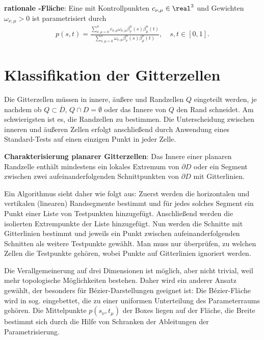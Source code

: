 \textbf{rationale -Fläche}:
Eine  mit Kontrollpunkten $c_{\nu,\mu} \in \real^3$ und
Gewichten $\omega_{\nu,\mu} > 0$ ist parametrisiert durch
\begin{align*}
    p(s, t) = \frac{\sum_{\nu,\mu=0}^n c_{\nu,\mu} \omega_{\nu,\mu} \beta_\nu^n(s) \beta_\mu^n(t)}
    {\sum_{\nu,\mu=0}^n \omega_{\nu,\mu} \beta_\nu^n(s) \beta_\mu^n(t)},\quad
    s, t \in [0, 1].
\end{align*}

\section{%
    Klassifikation der Gitterzellen%
}

Die Gitterzellen müssen in innere, äußere und Randzellen $Q$ eingeteilt werden, je nachdem
ob $Q \subset \overline{D}$, $Q \cap D = \emptyset$ oder das Innere von $Q$ den Rand schneidet.
Am schwierigsten ist es, die Randzellen zu bestimmen.
Die Unterscheidung zwischen inneren und äußeren Zellen erfolgt anschließend durch Anwendung
eines Standard-Tests auf einen einzigen Punkt in jeder Zelle.

\textbf{Charakterisierung planarer Gitterzellen}:
Das Innere einer planaren Randzelle enthält mindestens ein lokales Extremum von $\partial D$
oder ein Segment zwischen zwei aufeinanderfolgenden Schnittpunkten von $\partial D$ mit
Gitterlinien.

Ein Algorithmus sieht daher wie folgt aus:
Zuerst werden die horizontalen und vertikalen (linearen) Randsegmente bestimmt
und für jedes solches Segment ein Punkt einer Liste von Testpunkten hinzugefügt.
Anschließend werden die isolierten Extrempunkte der Liste hinzugefügt.
Nun werden die Schnitte mit Gitterlinien bestimmt und jeweils ein Punkt zwischen
aufeinanderfolgenden Schnitten als weitere Testpunkte gewählt.
Man muss nur überprüfen, zu welchen Zellen die Testpunkte gehören,
wobei Punkte auf Gitterlinien ignoriert werden.

\linie
\pagebreak

Die Verallgemeinerung auf drei Dimensionen ist möglich, aber nicht trivial,
weil mehr topologische Möglichkeiten bestehen.
Daher wird ein anderer Ansatz gewählt, der besonders für Bézier-Darstellungen geeignet ist:
Die Bézier-Fläche wird in sog.
 eingebettet, die zu einer uniformen Unterteilung
des Parameterraums gehören.
Die Mittelpunkte $p(s_\nu, t_\mu)$ der Boxes liegen auf der Fläche,
die Breite bestimmt sich durch die Hilfe von Schranken der Ableitungen der Parametrisierung.

